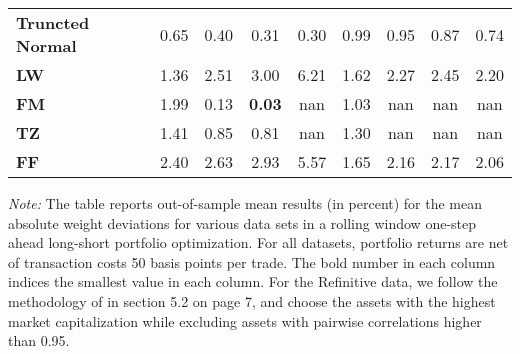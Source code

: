 \begin{table}[p]
{\begin{tabularx}{\textwidth}{Xcccccccc}
\textbf{Truncted Normal} & \cellcolor{gray!31}0.65 & \cellcolor{gray!31}0.40 & \cellcolor{gray!31}0.31 & \cellcolor{gray!40}0.30 & \cellcolor{gray!36}0.99 & \cellcolor{gray!40}0.95 & \cellcolor{gray!40}0.87 & \cellcolor{gray!40}0.74 \\
\textbf{LW} & \cellcolor{gray!27}1.36 & \cellcolor{gray!9}2.51 & \cellcolor{gray!4}3.00 & \cellcolor{gray!18}6.21 & \cellcolor{gray!9}1.62 & \cellcolor{gray!18}2.27 & \cellcolor{gray!18}2.45 & \cellcolor{gray!18}2.20 \\
\textbf{FM} & \cellcolor{gray!9}1.99 & \cellcolor{gray!36}0.13 & \cellcolor{gray!43}\textbf{0.03} & \cellcolor{gray!0}nan & \cellcolor{gray!31}1.03 & \cellcolor{gray!0}nan & \cellcolor{gray!0}nan & \cellcolor{gray!0}nan \\
\textbf{TZ} & \cellcolor{gray!22}1.41 & \cellcolor{gray!22}0.85 & \cellcolor{gray!27}0.81 & \cellcolor{gray!0}nan & \cellcolor{gray!22}1.30 & \cellcolor{gray!0}nan & \cellcolor{gray!0}nan & \cellcolor{gray!0}nan \\
\textbf{FF} & \cellcolor{gray!0}2.40 & \cellcolor{gray!4}2.63 & \cellcolor{gray!9}2.93 & \cellcolor{gray!22}5.57 & \cellcolor{gray!4}1.65 & \cellcolor{gray!22}2.16 & \cellcolor{gray!22}2.17 & \cellcolor{gray!22}2.06 \\
\bottomrule
\end{tabularx}
\vspace{0.3em}
{\footnotesize \textit{Note:} The table reports out-of-sample mean results (in percent) for the mean absolute weight deviations for various data sets in a rolling window one-step ahead long-short portfolio optimization. For all datasets, portfolio returns are net of transaction costs 50 basis points per trade. The bold number in each column indices the smallest value in each column. For the Refinitive data, we follow the methodology of \citet{denard2022} in section 5.2 on page 7, and choose the assets with the highest market capitalization while excluding assets with pairwise correlations higher than 0.95. }}
\end{table}